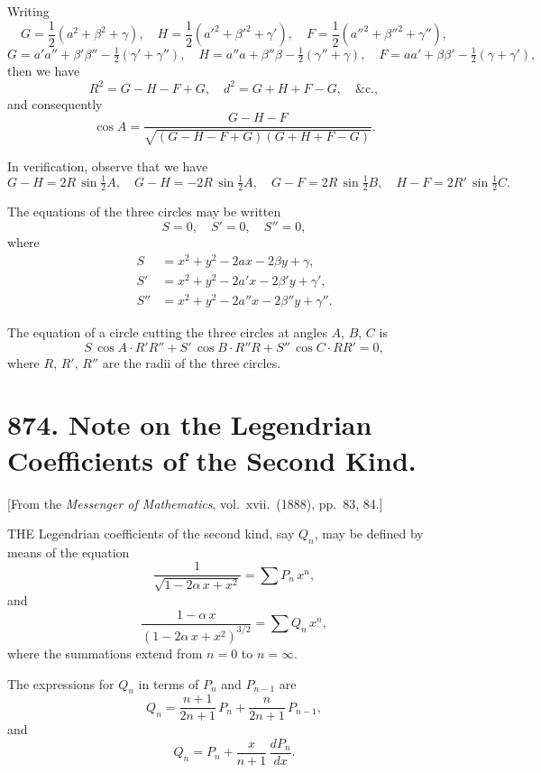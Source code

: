 \documentclass[12pt,a4paper]{article}
\theoremstyle{plain}
\begin{document}
Writing
\[
G = \frac{1}{2}(a^{2} + \beta^{2} + \gamma), \quad H = \frac{1}{2}(a'^{2} + \beta'^{2} + \gamma'), \quad F = \frac{1}{2}(a''^{2} + \beta''^{2} + \gamma''),
\]
\[
G = a' a'' + \beta' \beta'' - \tfrac{1}{2}(\gamma' + \gamma''), \quad
H = a'' a + \beta'' \beta - \tfrac{1}{2}(\gamma'' + \gamma), \quad
F = a a' + \beta \beta' - \tfrac{1}{2}(\gamma + \gamma'),
\]
then we have
\[
R^{2} = G - H - F + G, \quad d^{2} = G + H + F - G, \quad \&\text{c.},
\]
and consequently
\[
\cos A = \frac{G - H - F}{\sqrt{(G - H - F + G)(G + H + F - G)}}.
\]

\medskip\noindent
In verification, observe that we have
\[
G - H = 2R\,\sin\tfrac{1}{2}A, \quad G - H = -2R\,\sin\tfrac{1}{2}A, \quad G - F = 2R\,\sin\tfrac{1}{2}B, \quad H - F = 2R'\,\sin\tfrac{1}{2}C.
\]

\medskip\noindent
The equations of the three circles may be written
\[
S = 0, \quad S' = 0, \quad S'' = 0,
\]
where
\begin{align*}
S &= x^{2} + y^{2} - 2ax - 2\beta y + \gamma, \\
S' &= x^{2} + y^{2} - 2a'x - 2\beta' y + \gamma', \\
S'' &= x^{2} + y^{2} - 2a''x - 2\beta'' y + \gamma''.
\end{align*}

The equation of a circle cutting the three circles at angles $A$, $B$, $C$ is
\[
S\,\cos A \cdot R'R'' + S'\,\cos B \cdot R''R + S''\,\cos C \cdot RR' = 0,
\]
where $R$, $R'$, $R''$ are the radii of the three circles.

\newpage
\section[874]{874. Note on the Legendrian Coefficients of the Second Kind.}
\label{sec:874}

[From the \textit{Messenger of Mathematics}, vol.\ xvii.\ (1888), pp.\ 83, 84.]

\medskip\noindent
THE Legendrian coefficients of the second kind, say $Q_{n}$, may be defined by means of the equation
\[
\frac{1}{\sqrt{1 - 2\alpha\,x + x^{2}}} = \sum P_{n}\,x^{n},
\]
and
\[
\frac{1 - \alpha\,x}{(1 - 2\alpha\,x + x^{2})^{3/2}} = \sum Q_{n}\,x^{n},
\]
where the summations extend from $n = 0$ to $n = \infty$.

The expressions for $Q_{n}$ in terms of $P_{n}$ and $P_{n-1}$ are
\[
Q_{n} = \frac{n+1}{2n+1}\,P_{n} + \frac{n}{2n+1}\,P_{n-1},
\]
and
\[
Q_{n} = P_{n} + \frac{x}{n+1}\,\frac{dP_{n}}{dx}.
\]
\end{document}
